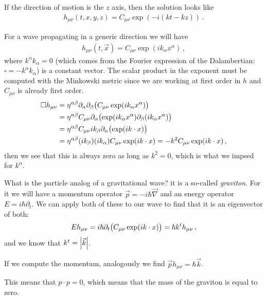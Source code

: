 \documentclass[main.tex]{subfiles}
\begin{document}
If the direction of motion is the \(z\) axis, then the solution looks like 
%
\begin{align}
h_{\mu \nu } (t, x, y, z) = C_{\mu \nu } \exp(-i (k t - k z ))
\,.
\end{align}

For a wave propagating in a generic direction we will have 
%
\begin{align}
h_{\mu \nu } (t, \vec{x}) = C_{\mu \nu } \exp(i k_{\alpha } x^{\alpha })
\,,
\end{align}
%
where \(k^{\alpha } k_{\alpha } = 0\) (which comes from the Fourier expression of the Dalambertian: \(\square = -k^{\alpha } k_{\alpha }\)) is a constant vector. The scalar product in the exponent must be computed with the Minkowski metric since we are working at  first order in \(h\) and \(C_{\mu \nu }\) is already first order.  
%
\begin{subequations}
\begin{align}
\square h_{\mu \nu } &= \eta^{\alpha \beta } \partial_{\alpha } \partial_{\beta } \qty(C_{\mu \nu } \exp(i k_{\alpha }x^{\alpha }))  \\
&= \eta^{\alpha  \beta } C_{\mu \nu } \partial_{\alpha } \qty(\exp(i k_{\alpha } x^{\alpha }) \partial_{\beta } \qty(i k_{\alpha } x^{\alpha }))  \\
&= \eta^{\alpha  \beta } C_{\mu \nu } i k_{ \beta } \partial_{\alpha } \qty(\exp(i k \cdot x )) \\
&= \eta^{\alpha \beta } (i k_{ \beta }) (ik_{\alpha }) C_{\mu \nu } \exp(i k \cdot x) = - k^2 C_{\mu \nu } \exp(i k \cdot x)
\,,
\end{align}
\end{subequations}
%
then we see that this is always zero as long as \(k^2=0\), which is what we impsed for \(k^{\alpha }\). 

What is the particle analog of a gravitational wave? it is a so-called \emph{graviton}. 
For it we will have a momentum operator \(\vec{p} = - i \hbar \vec{\nabla}\) and an energy operator \(E = i \hbar \partial_{t}\). We can apply both of these to our wave to find that it is an eigenvector of both: 
%
\begin{align}
E h_{\mu \nu } = i \hbar \partial_{t} \qty(C_{\mu \nu } \exp(i k \cdot x))= \hbar k^{t} h_{\mu \nu } 
\,,
\end{align}
%
and we know that \(k^{t} = \abs{\vec{k}}\). 

If we compute the momentum, analogously we find \(\vec{p} h_{\mu \nu } = \hbar \vec{k}\). 

This means that \(p \cdot p  = 0\), which means that the mass of the graviton is equal to zero. 
\end{document}
